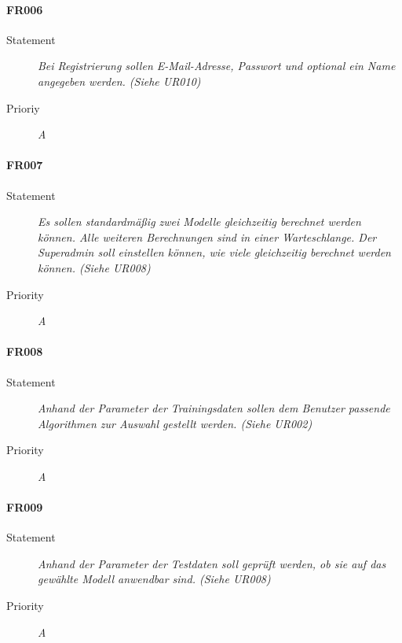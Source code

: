 \paragraph{FR006}
\begin{description}
  \item [Statement]
    \textit{Bei Registrierung sollen E-Mail-Adresse, Passwort und optional ein Name angegeben werden.
    (Siehe UR010)}
  \item [Prioriy] \textit{A}
\end{description}

\paragraph{FR007}
\begin{description}
  \item [Statement] 
    \textit{Es sollen standardmäßig zwei Modelle gleichzeitig berechnet werden können.
Alle weiteren Berechnungen sind in einer Warteschlange.
Der \gls{Superadmin} soll einstellen können, wie viele gleichzeitig berechnet werden können.
	(Siehe UR008)}
  \item [Priority] \textit{A}
\end{description}

\paragraph{FR008}
\begin{description}
  \item [Statement] 
    \textit{Anhand der Parameter der Trainingsdaten sollen dem Benutzer passende Algorithmen zur Auswahl gestellt werden.
	(Siehe UR002)}
  \item [Priority] \textit{A}
\end{description}

\paragraph{FR009}
\begin{description}
  \item [Statement] 
    \textit{Anhand der Parameter der Testdaten soll geprüft werden, ob sie auf das gewählte Modell anwendbar sind.
	(Siehe UR008)}
  \item [Priority] \textit{A}
\end{description}

